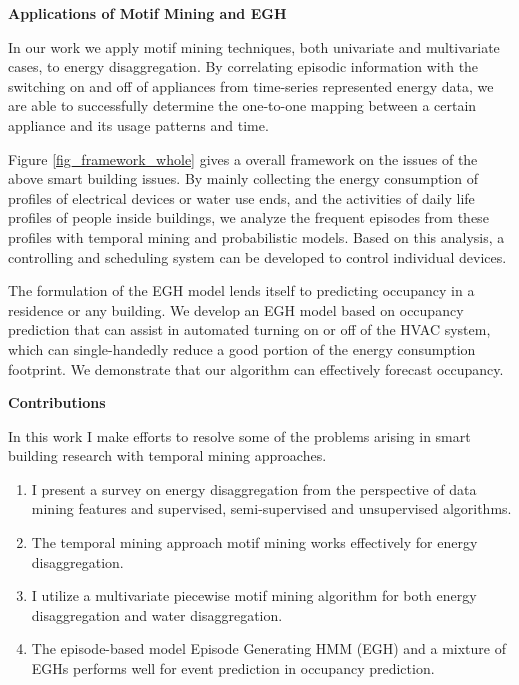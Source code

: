 \textbf{Applications of Motif Mining and EGH}

In our work we apply motif mining techniques, both univariate and multivariate cases, to energy disaggregation. By correlating episodic information with the switching on and off of appliances from time-series represented energy data, we are able to successfully determine the one-to-one mapping between a certain appliance and its usage patterns and time. 


Figure \ref{fig_framework_whole} gives a overall framework on the issues of the above smart building issues. 
By mainly collecting the energy consumption of profiles of electrical devices or water use ends, 
and the activities of daily life profiles of people inside buildings, we analyze the frequent episodes from these profiles with temporal mining and probabilistic models. Based on this analysis, a controlling and scheduling system can be developed to control individual devices. 

The formulation of the EGH model lends itself to predicting occupancy in a residence or any building. We develop an EGH model based on occupancy prediction that can assist in automated turning on or off of the HVAC system, which can single-handedly reduce a good portion of the energy consumption footprint. We demonstrate that our algorithm can effectively forecast occupancy.  

\textbf{Contributions}

In this work I make efforts to resolve some of the problems arising in smart building research with 
temporal mining approaches.
\begin{enumerate}
	\item I present a survey on energy disaggregation from the perspective of data mining features and supervised, semi-supervised and unsupervised algorithms. 
	\item The temporal mining approach motif mining works effectively for energy disaggregation. 
	\item I utilize a multivariate piecewise motif mining algorithm for both energy disaggregation and water disaggregation. 
	\item The episode-based model Episode Generating HMM (EGH) and a mixture of EGHs performs well for event prediction in occupancy prediction. 
\end{enumerate}



